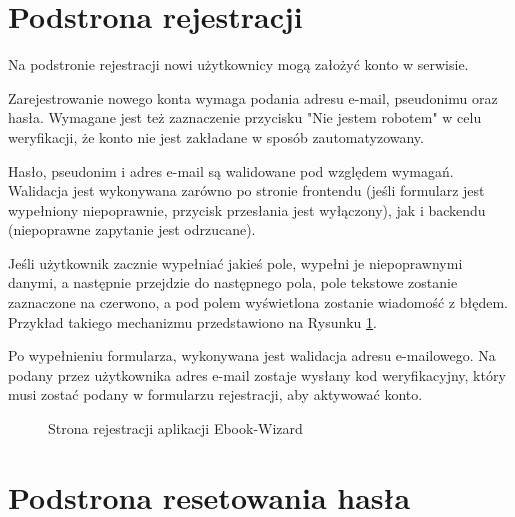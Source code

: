 \section{Podstrona rejestracji}

Na podstronie rejestracji nowi użytkownicy mogą założyć konto w serwisie.

Zarejestrowanie nowego konta wymaga podania adresu e-mail, pseudonimu oraz hasła. Wymagane jest też zaznaczenie przycisku "Nie jestem robotem" w celu weryfikacji, że konto nie jest zakładane w sposób zautomatyzowany.

Hasło, pseudonim i adres e-mail są walidowane pod względem wymagań. Walidacja jest wykonywana zarówno po stronie frontendu (jeśli formularz jest wypełniony niepoprawnie, przycisk przesłania jest wyłączony), jak i backendu (niepoprawne zapytanie jest odrzucane).

Jeśli użytkownik zacznie wypełniać jakieś pole, wypełni je niepoprawnymi danymi, a następnie przejdzie do następnego pola, pole tekstowe zostanie zaznaczone na czerwono, a pod polem wyświetlona zostanie wiadomość z błędem. Przykład takiego mechanizmu przedstawiono na Rysunku \ref{fig:ebook_wizard_registration_page}. 

Po wypełnieniu formularza, wykonywana jest walidacja adresu e-mailowego. Na podany przez użytkownika adres e-mail zostaje wysłany kod weryfikacyjny, który musi zostać podany w formularzu rejestracji, aby aktywować konto.

\begin{figure}[h]
    \centering
    \setlength{\fboxsep}{0pt}
    \setlength{\fboxrule}{0.4pt}
    \caption{Strona rejestracji aplikacji Ebook-Wizard}
    \label{fig:ebook_wizard_registration_page}
\end{figure}

\section{Podstrona resetowania hasła}

